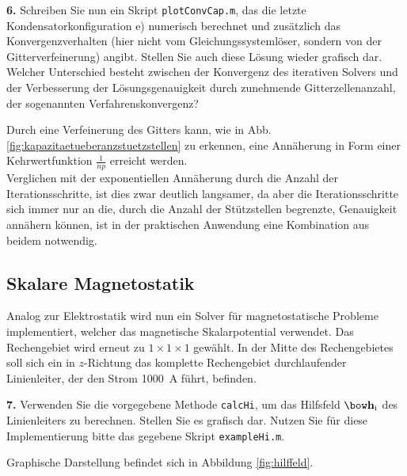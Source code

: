 \documentclass[Protokollheft.tex]{subfiles}
\begin{document}
\begin{framed}
	\noindent \textbf{6.} Schreiben Sie nun ein Skript \lstinline{plotConvCap.m}, das die letzte Kondensatorkonfiguration e) numerisch berechnet
und zusätzlich das Konvergenzverhalten (hier nicht vom Gleichungssystemlöser, sondern von der Gitterverfeinerung)
angibt. Stellen Sie auch diese Lösung wieder grafisch dar.\\
Welcher Unterschied besteht zwischen der Konvergenz des iterativen Solvers und der Verbesserung der Lösungsgenauigkeit durch zunehmende Gitterzellenanzahl, der sogenannten Verfahrenskonvergenz?\label{exer:plotCapConvMesh}
\end{framed}
\noindent
Durch eine Verfeinerung des Gitters kann, wie in Abb. \ref{fig:kapazitaetueberanzstuetzstellen} zu erkennen, eine Annäherung in Form einer Kehrwertfunktion $\frac{1}{np}$ erreicht werden. \\
Verglichen mit der exponentiellen Annäherung durch die Anzahl der Iterationsschritte, ist dies zwar deutlich langsamer, da aber die Iterationsschritte sich immer nur an die, durch die Anzahl der Stützstellen begrenzte, Genauigkeit annähern können, ist in der praktischen Anwendung eine Kombination aus beidem notwendig. 

%
{\subsection{Skalare Magnetostatik}}
Analog zur Elektrostatik wird nun ein Solver für magnetostatische Probleme implementiert, welcher das magnetische Skalarpotential verwendet. Das Rechengebiet wird erneut zu $1\times 1\times 1$ gewählt. In der Mitte des Rechengebietes soll sich ein in $z$-Richtung das komplette Rechengebiet durchlaufender Linienleiter, der den Strom \SI{1000}{A} führt, befinden.

\begin{framed}
	\noindent \textbf{7.} Verwenden Sie die vorgegebene Methode \lstinline{calcHi}, um das Hilfsfeld $\hfit_{\text{i}}$ des Linienleiters zu berechnen.
Stellen Sie es grafisch dar. Nutzen Sie für diese Implementierung bitte das gegebene Skript \lstinline{exampleHi.m}.\label{exer:visualizeHi}
\end{framed}

Graphische Darstellung befindet sich in Abbildung \ref{fig:hilffeld}.
\end{document}
